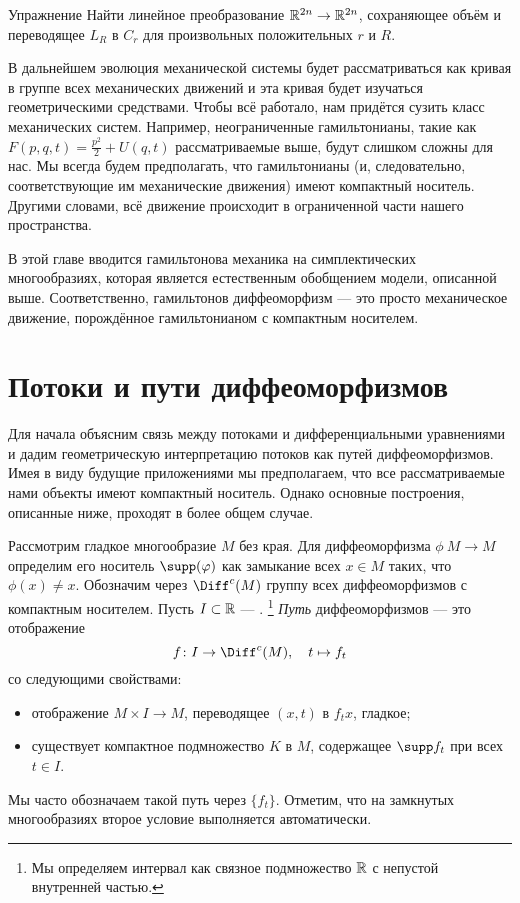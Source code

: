 \begin{thm*}{Упражнение}
Найти линейное преобразование $\mathbb{R}^{2n} \to \mathbb{R}^{2n}$, сохраняющее объём и переводящее $L_R$ в $C_r$ для произвольных положительных $r$ и $R$.
\end{thm*}

В дальнейшем эволюция механической системы будет рассматриваться как кривая в группе всех механических движений и эта кривая будет изучаться геометрическими средствами.
Чтобы всё работало, нам придётся сузить класс механических систем.
Например, неограниченные гамильтонианы, такие как $F(p,q,t) = \tfrac {p^2}2 + U(q,t)$ рассматриваемые выше, будут слишком сложны для нас.
Мы всегда будем предполагать, что гамильтонианы (и, следовательно, соответствующие им механические движения) имеют компактный носитель.
Другими словами, всё движение происходит в ограниченной части нашего пространства.

В этой главе вводится гамильтонова механика на симплектических многообразиях, которая является естественным обобщением модели, описанной выше.
Соответственно, гамильтонов диффеоморфизм --- это просто механическое движение, порождённое гамильтонианом с компактным носителем. 

\section{Потоки и пути диффеоморфизмов}

Для начала объясним связь между потоками и дифференциальными уравнениями и дадим геометрическую интерпретацию потоков как путей диффеоморфизмов.
Имея в виду будущие приложениями мы предполагаем, что все рассматриваемые нами объекты имеют компактный носитель.
Однако основные построения, описанные ниже, проходят в более общем случае.

Рассмотрим гладкое многообразие $M$ без края.
Для диффеоморфизма $\phi\: M \to M$ определим его носитель $\supp (\phi)$ как замыкание всех  $x \in M$ таких, что $\phi(x) \ne x$.
Обозначим через $\Diff^c (M)$ группу всех диффеоморфизмов с компактным носителем.
Пусть $I \subset \mathbb{R}$ --- .%
\footnote{Мы определяем интервал как связное подмножество $\mathbb{R}$ с непустой внутренней частью.}
\emph{Путь} диффеоморфизмов --- это отображение 
\[f\: I \to \Diff^c (M),\quad t \mapsto f_t\]
со следующими свойствами:
\begin{itemize}
\item отображение $M \times I \to M$, переводящее $(x, t)$ в $f_t x$, гладкое;
\item существует компактное подмножество $K$ в $M$, содержащее $\supp f_t$ при всех $t \in I$.
\end{itemize}
Мы часто обозначаем такой путь через $\{f_t\}$.
Отметим, что на замкнутых многообразиях второе условие выполняется автоматически.

